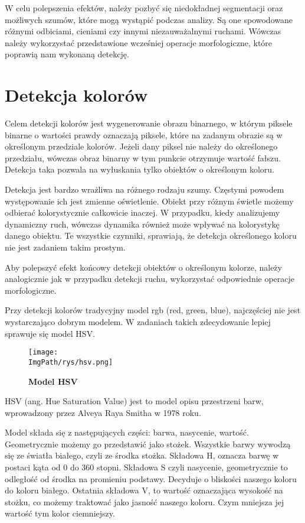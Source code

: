\documentclass[a4paper,12pt,twoside,openany]{report}
\newcommand{\ImgPath}{.}
\begin{document}
W celu polepszenia efektów, należy pozbyć się niedokładnej segmentacji oraz możliwych szumów,  które mogą wystąpić podczas analizy. Są one spowodowane różnymi odbiciami, cieniami czy innymi niezauważalnymi ruchami. Wówczas należy wykorzystać przedstawione wcześniej operacje morfologiczne, które poprawią nam wykonaną detekcję.

\section{Detekcja kolorów}
Celem detekcji kolorów jest wygenerowanie obrazu binarnego, w którym piksele binarne  o wartości prawdy oznaczają piksele, które na zadanym obrazie są w określonym przedziale kolorów. Jeżeli dany piksel nie należy do określonego  przedziału, wówczas obraz binarny w tym punkcie otrzymuje wartość fałszu. Detekcja taka pozwala na wyłuskania tylko obiektów o określonym koloru.

Detekcja jest bardzo wrażliwa na różnego rodzaju szumy. Częstymi powodem występowanie ich jest zmienne oświetlenie. Obiekt przy różnym świetle możemy odbierać kolorystycznie całkowicie inaczej. W przypadku, kiedy analizujemy dynamiczny ruch, wówczas dynamika również może wpływać na kolorystykę danego obiektu. Te wszystkie czynniki, sprawiają, że detekcja określonego koloru nie jest zadaniem takim prostym. 

Aby polepszyć efekt końcowy detekcji obiektów o określonym kolorze, należy analogicznie jak w przypadku detekcji ruchu, wykorzystać odpowiednie operacje morfologiczne. 

Przy detekcji kolorów tradycyjny model rgb (red, green, blue), najczęściej nie jest wystarczająco dobrym modelem. W zadaniach takich zdecydowanie lepiej sprawuje się model HSV.

\begin{figure}[H]	
	\centering
	\texttt{[image: \\ImgPath/rys/hsv.png]}
	
	\caption{  \textbf{Model HSV}}
\end{figure}

HSV (ang. Hue Saturation Value) jest to model opisu przestrzeni barw, wprowadzony przez Alveya Raya Smitha w 1978 roku.

Model składa się z następujących części: barwa, nasycenie, wartość. Geometrycznie możemy go przedstawić jako stożek. Wszystkie barwy wywodzą się ze światła białego, czyli ze środka stożka. Składowa H, oznacza barwę w postaci kąta od 0 do 360 stopni. Składowa S czyli nasycenie, geometrycznie to odległość od środka na promieniu podstawy. Decyduje o bliskości naszego koloru do koloru białego. Ostatnia składowa V, to wartość oznaczająca wysokość na stożku, co możemy traktować jako jasność naszego koloru. Czym mniejsza jej wartość tym kolor ciemniejszy.
\end{document}

